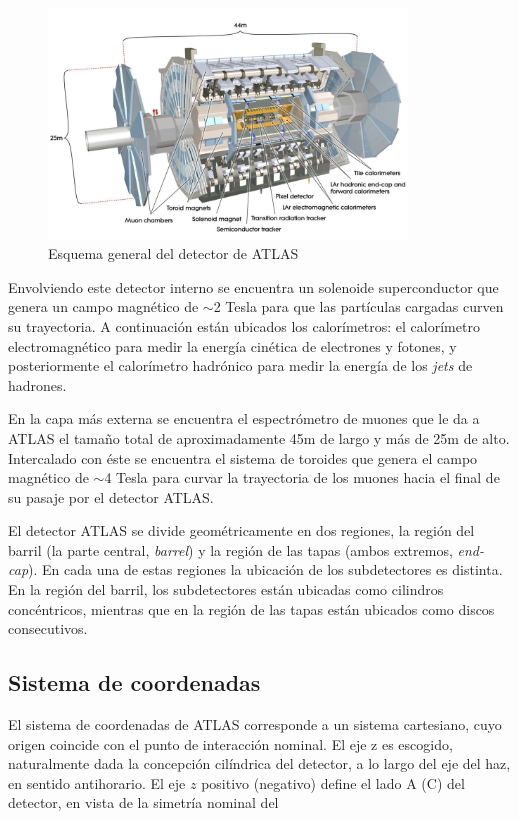 \begin{figure}[H]
  \centering
  \includegraphics[width=0.85\textwidth]{figures/atlas}
  \caption{Esquema general del detector de ATLAS}\label{fig:atlas}
\end{figure}


Envolviendo este detector interno se encuentra un solenoide superconductor que genera un campo
magnético de $\sim$2 Tesla para que las partículas cargadas curven su trayectoria.
A continuación están ubicados los calorímetros: el calorímetro electromagnético para medir la
energía cinética de electrones y fotones, y posteriormente el calorímetro hadrónico para medir
la energía de los \emph{jets} de hadrones.

En la capa más externa se encuentra el espectrómetro de muones que le da a ATLAS el tamaño total
de aproximadamente 45m de largo y más de 25m de alto.
Intercalado con éste se encuentra el sistema de toroides que genera el campo magnético de $\sim$4
Tesla para curvar la trayectoria de los muones hacia el final de su pasaje por el detector ATLAS.

El detector ATLAS se divide geométricamente en dos regiones, la región del barril
(la parte central, \emph{barrel}) y la región de las tapas (ambos extremos, \emph{end-cap}).
En cada una de estas regiones la ubicación de los subdetectores es distinta. En la región del barril,
los subdetectores están ubicadas como cilindros concéntricos, mientras que en la región de las tapas
están ubicados como discos consecutivos.

\subsection{Sistema de coordenadas}

El sistema de coordenadas de ATLAS corresponde a un sistema cartesiano, cuyo origen
coincide con el punto de interacción nominal. El eje z es escogido, naturalmente dada la
concepción cilíndrica del detector, a lo largo del eje del haz, en sentido antihorario. El eje
$z$ positivo (negativo) define el lado A (C) del detector, en vista de la simetría nominal del

